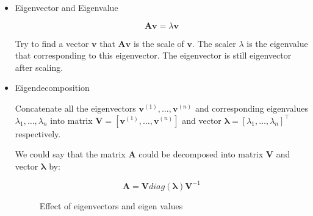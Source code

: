 \begin{itemize}
  \item Eigenvector and Eigenvalue

  \begin{equation} \tag{2.39}
    \label{eq_2_39}
    \bm{Av} = \lambda \bm{v}
  \end{equation}

  Try to find a vector $\bm{v}$ that $\bm{Av}$ is the scale of $\bm{v}$.
    The scaler $\lambda$ is the eigenvalue that corresponding to this eigenvector.
    The eigenvector is still eigenvector after scaling.

  \item Eigendecomposition

  Concatenate all the eigenvectors $\bm{v} ^ {(1)} , \ldots , \bm{v} ^ {(n)}$
    and corresponding eigenvalues $\lambda _ {1} , \ldots , \lambda _ {n}$
    into matrix $\bm{V} = [ \bm{v} ^ {(1)} , \ldots , \bm{v} ^ {(n)} ]$
    and vector ${\bm{\lambda} = [ \lambda _ {1} , \ldots , \lambda _ {n} ]} ^ \top$
    respectively.

  We could say that the matrix $\bm{A}$ could be decomposed into matrix $\bm{V}$ and vector $\bm{\lambda}$ by:

  \begin{equation} \tag{2.40}
    \label{eq_2_40}
    \bm{A} = \bm{V} diag(\bm{\lambda}) \bm{V} ^ {-1}
  \end{equation}

  \setcounter{figure}{2}
  \begin{figure}[h]
    \begin{center}
      Effect of eigenvectors and eigen values\par
\end{center}
\end{figure}
\end{itemize}
